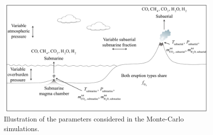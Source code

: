 \begin{figure}
    \centering
    \includegraphics[width=\textwidth]{tex/3methane/figures/outgasing_diagram.pdf}
    \caption{Illustration of the parameters considered in the Monte-Carlo simulations.}
    \label{fig:digram}
\end{figure}

